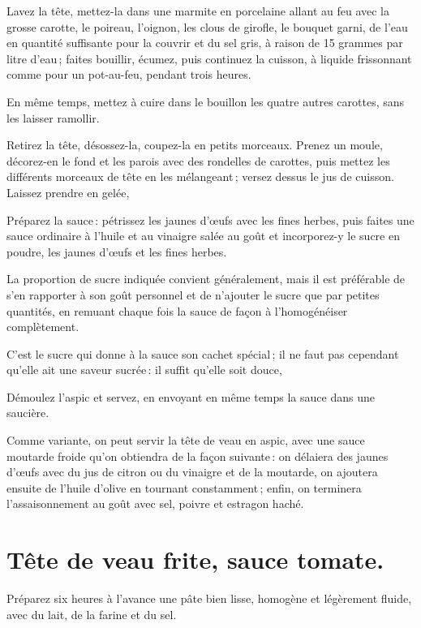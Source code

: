 \medskip

Lavez la tête, mettez-la dans une marmite en porcelaine allant au feu avec la
grosse carotte, le poireau, l'oignon, les clous de girofle, le bouquet garni,
de l'eau en quantité suffisante pour la couvrir et du sel gris, à raison de 15
grammes par litre d'eau ; faites bouillir, écumez, puis continuez la cuisson,
à liquide frissonnant comme pour un pot-au-feu, pendant trois heures.

En même temps, mettez à cuire dans le bouillon les quatre autres carottes, sans
les laisser ramollir.

Retirez la tête, désossez-la, coupez-la en petits morceaux. Prenez un moule,
décorez-en le fond et les parois avec des rondelles de carottes, puis mettez
les différents morceaux de tête en les mélangeant ; versez dessus le jus de
cuisson. Laissez prendre en gelée,

Préparez la sauce : pétrissez les jaunes d'œufs avec les fines herbes, puis
faites une sauce ordinaire à l'huile et au vinaigre salée au goût et
incorporez-y le sucre en poudre, les jaunes d'œufs et les fines herbes.

La proportion de sucre indiquée convient généralement, mais il est préférable
de s'en rapporter à son goût personnel et de n'ajouter le sucre que par petites
quantités, en remuant chaque fois la sauce de façon à l'homogénéiser
complètement.

C'est le sucre qui donne à la sauce son cachet spécial ; il ne faut pas
cependant qu'elle ait une saveur sucrée : il suffit qu'elle soit douce,

Démoulez l'aspic et servez, en envoyant en même temps la sauce dans une
saucière.

\sk

Comme variante, on peut servir la tête de veau en aspic, avec une sauce
moutarde froide qu'on obtiendra de la façon suivante : on délaiera des jaunes
d'œufs avec du jus de citron ou du vinaigre et de la moutarde, on ajoutera
ensuite de l'huile d'olive en tournant constamment ; enfin, on terminera
l'assaisonnement au goût avec sel, poivre et estragon haché.

\section*{\centering Tête de veau frite, sauce tomate.}

Préparez six heures à l'avance une pâte bien lisse, homogène et légèrement
fluide, avec du lait, de la farine et du sel.

